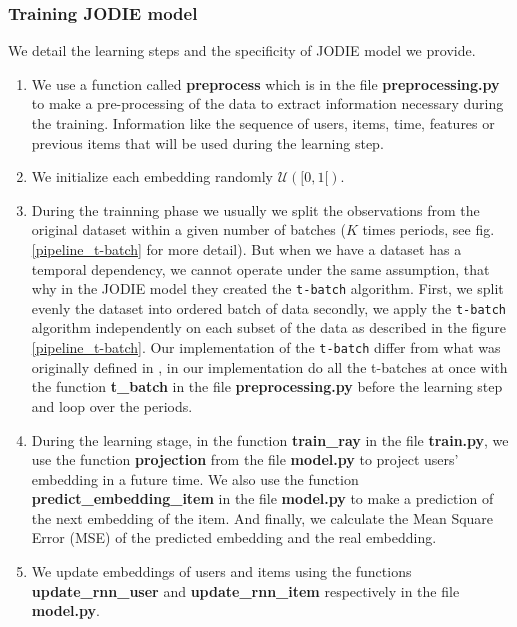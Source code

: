 \subsubsection{Training JODIE model} 
\label{sec:trainning}

We detail the learning steps and the specificity of JODIE model we provide. 
\begin{enumerate}
    \item We use a function called \textbf{preprocess} which is in the file \textbf{preprocessing.py} to make a pre-processing of the data to extract information necessary during the training. Information like the sequence of users, items, time, features or previous items that will be used during the learning step.
    \item We initialize each embedding randomly $\mathcal{U}([0,1[)$.
    \item During the trainning phase we usually we split the observations from the original dataset within a given number of batches ($K$ times periods, see fig. \ref{pipeline_t-batch} for more detail). But when we have a dataset has a temporal dependency, we cannot operate under the same assumption, that why in the JODIE model they created the \texttt{t-batch} algorithm. First, we split evenly the dataset into ordered batch of data secondly, we apply the \texttt{t-batch} algorithm independently on each subset of the data as described in the figure \ref{pipeline_t-batch}. Our implementation of the \texttt{t-batch} differ from what was originally defined in \cite{kumar18}, in our implementation do all the t-batches at once with the function \textbf{t\_batch} in the file \textbf{preprocessing.py} before the learning step and loop over the periods.
    \item During the learning stage, in the function \textbf{train\_ray} in the file \textbf{train.py}, we use the function \textbf{projection} from the file \textbf{model.py} to project users' embedding in a future time. We also use the function \textbf{predict\_embedding\_item} in the file \textbf{model.py} to make a prediction of the next embedding of the item. And finally, we calculate the Mean Square Error (MSE) of the predicted embedding and the real embedding.
    \item We update embeddings of users and items using the functions \textbf{update\_rnn\_user} and \textbf{update\_rnn\_item} respectively in the file \textbf{model.py}.

\end{enumerate}
